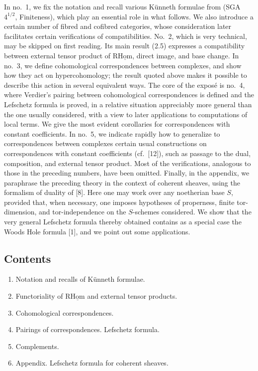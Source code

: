 In no.~1, we fix the notation and recall various Künneth formulae from (SGA~$4^{1/2}$, Finiteness), which play an essential role in what follows. We also introduce a certain number of fibred and cofibred categories, whose consideration later facilitates certain verifications of compatibilities. No.~2, which is very technical, may be skipped on first reading. Its main result (2.5) expresses a compatibility between external tensor product of $\mathrm{R}\underline{\mathrm{Hom}}$, direct image, and base change. In no.~3, we define cohomological correspondences between complexes, and show how they act on hypercohomology; the result quoted above makes it possible to describe this action in several equivalent ways. The core of the exposé is no.~4, where Verdier's pairing between cohomological correspondences is defined and the Lefschetz formula is proved, in a relative situation appreciably more general than the one usually considered, with a view to later applications to computations of local terms. We give the most evident corollaries for correspondences with constant coefficients. In no.~5, we indicate rapidly how to generalize to correspondences between complexes certain usual constructions on correspondences with constant coefficients (cf.~[12]), such as passage to the dual, composition, and external tensor product. Most of the verifications, analogous to those in the preceding numbers, have been omitted. Finally, in the appendix, we paraphrase the preceding theory in the context of coherent sheaves, using the formalism of duality of [8]. Here one may work over any noetherian base $S$, provided that, when necessary, one imposes hypotheses of properness, finite tor-dimension, and tor-independence on the $S$-schemes considered. We show that the very general Lefschetz formula thereby obtained contains as a special case the Woods Hole formula [1], and we point out some applications.

\subsection*{Contents}
\begin{enumerate}[label=\arabic*.]
\item Notation and recalls of Künneth formulae.
\item Functoriality of $\mathrm{R}\underline{\mathrm{Hom}}$ and external tensor products.
\item Cohomological correspondences.
\item Pairings of correspondences. Lefschetz formula.
\item Complements.
\item Appendix. Lefschetz formula for coherent sheaves.
\end{enumerate}


